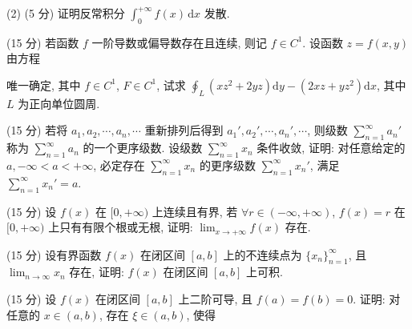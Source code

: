 (2) (5 分) 证明反常积分 $\int_0^{+\infty} f(x) \, \mathrm{d}x$ 发散.\par
\par{}
\par{}
(15 分) 若函数 $f$ 一阶导数或偏导数存在且连续, 则记 $f \in C^{1}$. 设函数 $z = f(x, y)$ 由方程\par
\nopagebreak[4]
唯一确定, 其中 $f \in C^{1}$, $F \in C^{1}$, 试求 $\oint_{L} (xz^{2} + 2yz) \mathrm{d}y - (2xz + yz^{2}) \mathrm{d}x$, 其中 $L$ 为正向单位圆周.\par
\par{}
(15 分) 若将 $a_1, a_2, \cdots, a_n, \cdots$ 重新排列后得到 $a_1', a_2', \cdots, a_n', \cdots$, 则级数 $\sum_{n=1}^{\infty} a_n'$ 称为 $\sum_{n=1}^{\infty} a_n$ 的一个更序级数. 设级数 $\sum_{n=1}^{\infty} x_n$ 条件收敛, 证明: 对任意给定的 $a, -\infty < a < +\infty$, 必定存在 $\sum_{n=1}^{\infty} x_n$ 的更序级数 $\sum_{n=1}^{\infty} x_n'$, 满足 $\sum_{n=1}^{\infty} x_n' = a$.\par
\par{}
(15 分) 设 $f(x)$ 在 $[0, +\infty)$ 上连续且有界, 若 $\forall r \in (-\infty, +\infty)$, $f(x) = r$ 在 $[0, +\infty)$ 上只有有限个根或无根, 证明: $\lim_{x \to +\infty} f(x)$ 存在.\par
\par{}
(15 分) 设有界函数 $f(x)$ 在闭区间 $[a, b]$ 上的不连续点为 $\{x_n\}_{n=1}^{\infty}$, 且 $\lim_{n \to \infty} x_n$ 存在, 证明: $f(x)$ 在闭区间 $[a, b]$ 上可积.\par
\par{}
\par{}
(15 分) 设 $f(x)$ 在闭区间 $[a, b]$ 上二阶可导, 且 $f(a) = f(b) = 0$. 证明: 对任意的 $x \in (a, b)$, 存在 $\xi \in (a, b)$, 使得\par
\nopagebreak[4]
